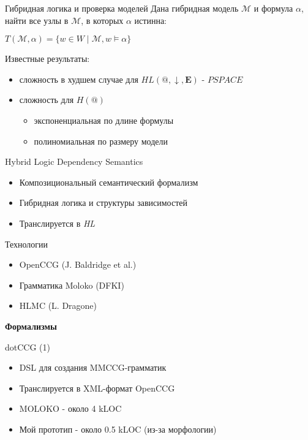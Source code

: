 \documentclass{beamer}
\begin{document}
\begin{frame}{Гибридная логика и проверка моделей}
Дана гибридная модель $\mathcal{M}$ и формула $\alpha$, найти все узлы в $\mathcal{M}$, в которых $\alpha$ истинна:
\bigskip
\begin{center}
    $T(\mathcal{M}, \alpha) = \{ w \in W \; | \; \mathcal{M}, w \models \alpha \}$
\end{center}
\bigskip
Известные результаты:\\
\bigskip
\begin{itemize}
	\item сложность в худшем случае для $HL(@, \downarrow, \textbf{E})$ - $PSPACE$
	\item сложность для $H(@)$ 
		\begin{itemize}
			\item экспоненциальная по длине формулы
			\item полиномиальная по размеру модели
		\end{itemize}
\end{itemize}
\end{frame}

\begin{frame}{Hybrid Logic Dependency Semantics}
\begin{itemize}
	\item Композициональный семантический формализм
	\item Гибридная логика и структуры зависимостей
	\item Транслируется в \textit{HL}
\end{itemize}
\end{frame}

\begin{frame}{Технологии}
\begin{itemize}
	\item OpenCCG (J. Baldridge et al.)
	\item Грамматика Moloko (DFKI)
	\item HLMC (L. Dragone)
\end{itemize}
\end{frame}

\begin{frame}{}
\begin{center}
	\textbf{Формализмы}\\
\end{center}
\end{frame}


\begin{frame}{dotCCG (1)}
\begin{itemize}
	\item DSL для создания MMCCG-грамматик
	\item Транслируется в XML-формат OpenCCG
	\item MOLOKO - около 4 kLOC 
	\item Мой прототип - около 0.5 kLOC (из-за морфологии)
\end{itemize}
\end{frame}
\end{document}
